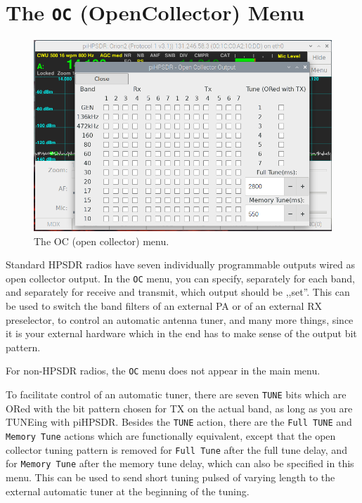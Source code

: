 \documentclass[12pt]{book}
\def\rett#1{\texttt{\color{red}#1}}
\def\bltt#1{\texttt{\color{blue}#1}}
\begin{document}
\section{The \texttt{OC} (OpenCollector) Menu}

\begin{figure}[ht]
\center
\includegraphics[width=12cm]{OCMenu.png}
\caption{The OC (open collector) menu.}
\label{fig:OCMenu}
\end{figure}

Standard HPSDR radios have seven individually programmable outputs wired as
open collector output. In the \bltt{OC} menu, you can specify, separately
for each band, and separately for receive and transmit, which output should
be ,,set''. This can be used to switch the band filters of an external PA
or of an external RX preselector, to control an automatic antenna tuner,
and many more things, since it is
your external hardware which in the end has to make sense of the output
bit pattern.

For non-HPSDR radios, the \bltt{OC} menu does not appear in the main menu.

To facilitate control of an automatic tuner, there are seven \rett{TUNE}
bits which are ORed with the bit pattern chosen for TX on the actual band,
as long as you are TUNEing with piHPSDR. Besides the \bltt{TUNE} action,
there are the \bltt{Full TUNE} and \bltt{Memory Tune} actions which are
functionally equivalent, except that the open collector tuning pattern
is removed for \bltt{Full Tune} after the full tune delay, and for \bltt{Memory Tune}
after the memory tune delay, which can also be specified in this menu.
This can be used to send short tuning pulsed of varying length to the
external automatic tuner at the beginning of the tuning.
\end{document}
